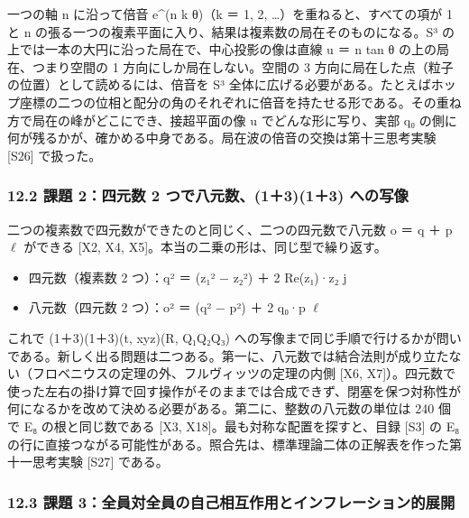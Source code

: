 \documentclass[
  a4paper,
]{ltjsarticle}
\providecommand{\tightlist}{%
  \setlength{\itemsep}{0pt}\setlength{\parskip}{0pt}}
\begin{document}
一つの軸 n に沿って倍音 e\^{}(n k θ)（k ＝ 1, 2,
\ldots）を重ねると、すべての項が 1 と n
の張る一つの複素平面に入り、結果は複素数の局在そのものになる。S³
の上では一本の大円に沿った局在で、中心投影の像は直線 u ＝ n tan θ
の上の局在、つまり空間の 1 方向にしか局在しない。空間の 3
方向に局在した点（粒子の位置）として読めるには、倍音を S³
全体に広げる必要がある。たとえばホップ座標の二つの位相と配分の角のそれぞれに倍音を持たせる形である。その重ね方で局在の峰がどこにでき、接超平面の像
u でどんな形に写り、実部 q₀
の側に何が残るかが、確かめる中身である。局在波の倍音の交換は第十三思考実験
{[}S26{]} で扱った。

\subsubsection{12.2 課題 2：四元数 2 つで八元数、(1＋3)(1＋3)
への写像}\label{ux8ab2ux984c-2ux56dbux5143ux6570-2-ux3064ux3067ux516bux5143ux65701313-ux3078ux306eux5199ux50cf}

二つの複素数で四元数ができたのと同じく、二つの四元数で八元数 o ＝ q ＋ p
\(\ell\) ができる {[}X2, X4, X5{]}。本当の二乗の形は、同じ型で繰り返す。

\begin{itemize}
\tightlist
\item
  四元数（複素数 2 つ）：q² ＝ (z₁² − \textbar z₂\textbar²) ＋ 2
  Re(z₁)·z₂ j
\item
  八元数（四元数 2 つ）：o² ＝ (q² − \textbar p\textbar²) ＋ 2 q₀·p
  \(\ell\)
\end{itemize}

これで (1＋3)(1＋3)(t, xyz)(R, Q₁Q₂Q₃)
への写像まで同じ手順で行けるかが問いである。新しく出る問題は二つある。第一に、八元数では結合法則が成り立たない（フロベニウスの定理の外、フルヴィッツの定理の内側
{[}X6,
X7{]}）。四元数で使った左右の掛け算で回す操作がそのままでは合成できず、閉塞を保つ対称性が何になるかを改めて決める必要がある。第二に、整数の八元数の単位は
240 個で E₈ の根と同じ数である {[}X3,
X18{]}。最も対称な配置を探すと、目録 {[}S3{]} の E₈
の行に直接つながる可能性がある。照合先は、標準理論二体の正解表を作った第十一思考実験
{[}S27{]} である。

\subsubsection{12.3 課題
3：全員対全員の自己相互作用とインフレーション的展開}\label{ux8ab2ux984c-3ux5168ux54e1ux5bfeux5168ux54e1ux306eux81eaux5df1ux76f8ux4e92ux4f5cux7528ux3068ux30a4ux30f3ux30d5ux30ecux30fcux30b7ux30e7ux30f3ux7684ux5c55ux958b}
\end{document}
